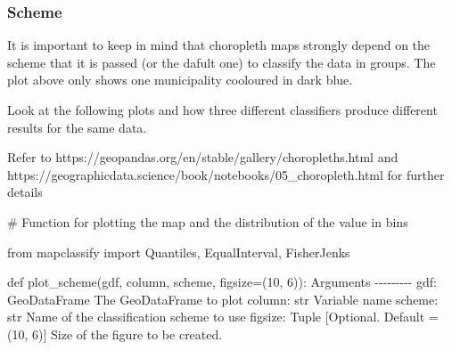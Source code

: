 \documentclass[
  letterpaper,
  DIV=11,
  numbers=noendperiod]{scrreprt}
\newenvironment{Shaded}{\begin{snugshade}}{\end{snugshade}}
\newcommand{\CommentTok}[1]{\textcolor[rgb]{0.37,0.37,0.37}{#1}}
\newcommand{\DecValTok}[1]{\textcolor[rgb]{0.68,0.00,0.00}{#1}}
\newcommand{\ImportTok}[1]{\textcolor[rgb]{0.00,0.46,0.62}{#1}}
\newcommand{\KeywordTok}[1]{\textcolor[rgb]{0.00,0.23,0.31}{#1}}
\newcommand{\NormalTok}[1]{\textcolor[rgb]{0.00,0.23,0.31}{#1}}
\newcommand{\OperatorTok}[1]{\textcolor[rgb]{0.37,0.37,0.37}{#1}}
\begin{document}
\subsubsection{Scheme}\label{scheme}

It is important to keep in mind that choropleth maps strongly depend on
the scheme that it is passed (or the dafult one) to classify the data in
groups. The plot above only shows one municipality cooloured in dark
blue.

Look at the following plots and how three different classifiers produce
different results for the same data.

Refer to https://geopandas.org/en/stable/gallery/choropleths.html and
https://geographicdata.science/book/notebooks/05\_choropleth.html for
further details

\begin{Shaded}
\begin{Highlighting}[]
\CommentTok{\# Function for plotting the map and the distribution of the value in bins  }

\ImportTok{from}\NormalTok{ mapclassify }\ImportTok{import}\NormalTok{ Quantiles, EqualInterval, FisherJenks}

\KeywordTok{def}\NormalTok{ plot\_scheme(gdf, column, scheme, figsize}\OperatorTok{=}\NormalTok{(}\DecValTok{10}\NormalTok{, }\DecValTok{6}\NormalTok{)):}
    \CommentTok{\textquotesingle{}\textquotesingle{}\textquotesingle{}}
\CommentTok{    Arguments}
\CommentTok{    {-}{-}{-}{-}{-}{-}{-}{-}{-}}
\CommentTok{    gdf: GeoDataFrame}
\CommentTok{        The GeoDataFrame to plot}
\CommentTok{    column: str}
\CommentTok{        Variable name }
\CommentTok{    scheme: str}
\CommentTok{        Name of the classification scheme to use }
\CommentTok{    figsize: Tuple}
\CommentTok{        [Optional. Default = (10, 6)] Size of the figure to be created.}


\end{Highlighting}
\end{Shaded}
\end{document}
